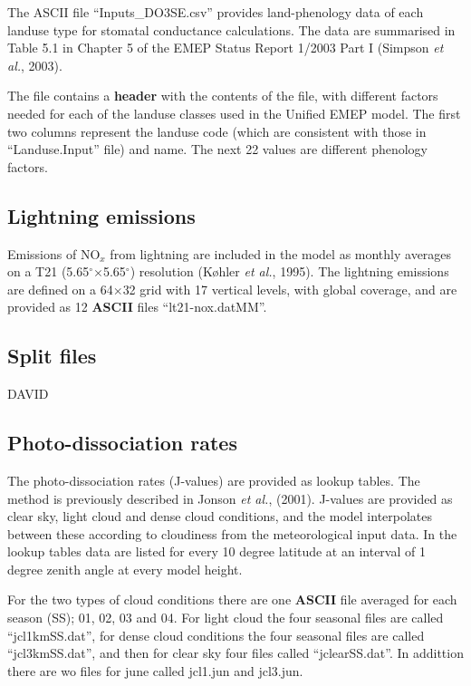 The  ASCII file ``Inputs\_DO3SE.csv'' provides land-phenology data
of each landuse type for stomatal conductance calculations. The 
data are summarised in Table 5.1 in Chapter 5 of the EMEP 
Status Report 1/2003 Part I (Simpson {\sl et al.}, 2003).

The file contains a {\bf header} with the contents of the file,
with different factors needed for each of the landuse classes used
in the Unified EMEP model. The first two columns represent the
landuse code (which are consistent with those in ``Landuse.Input'' file)
and name. The next 22 values are different phenology factors.

\subsection{Lightning emissions}
Emissions of NO$_{x}$ from lightning are included in the model
as monthly averages on a T21 (5.65$^{\circ}$$\times$5.65$^{\circ}$) resolution (K{\o}hler {\sl et al.}, 1995). 
The lightning emissions are defined on a 64$\times$32 grid with 17 vertical
levels, with global coverage, and are provided as 12 {\bf ASCII} files
``lt21-nox.datMM''.




\subsection{Split files}
DAVID

\subsection{Photo-dissociation rates}
The photo-dissociation rates (J-values) are provided as lookup
tables. The method is previously described in Jonson {\sl et
al.}, (2001). J-values are provided as clear sky, light cloud and dense
cloud conditions, and the model interpolates between these according
to cloudiness from the meteorological input data. In the lookup tables
data are listed for every 10 degree latitude at an interval of 1
degree zenith angle at every model height.

For the two types of cloud conditions there are one {\bf ASCII} file 
averaged for each season (SS); 01, 02, 03 and 04. 
For light cloud the four seasonal files are called ``jcl1kmSS.dat'', for dense cloud conditions
the four seasonal files are called ``jcl3kmSS.dat'', and then for clear sky four files 
called ``jclearSS.dat''. In addittion there are wo files for june called jcl1.jun 
and jcl3.jun.

